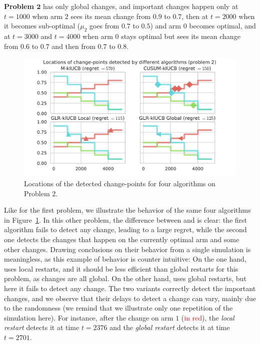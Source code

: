 \textbf{Problem $\bm{2}$} has only global changes, and important changes happen only at $t=1000$ when arm $2$ sees its mean change from $0.9$ to $0.7$, then at $t=2000$ when it becomes sub-optimal ($\mu_2$ goes from $0.7$ to $0.5$) and arm $0$ becomes optimal, and at $t=3000$ and $t=4000$ when arm $0$ stays optimal but sees its mean change from $0.6$ to $0.7$ and then from $0.7$ to $0.8$.

\begin{figure}[h!]  %
    \centering
    \includegraphics[width=0.96\linewidth]{2-Chapters/6-Chapter/Images/Visualizing_locations_of_change_points_for_different_algorithms__4algs_Pb2.pdf}
    \caption{Locations of the detected change-points for four algorithms on Problem 2.}
    \label{fig:6:Visualizing_locations_of_change_points_for_different_algorithms__4algs_Pb2}
\end{figure}

Like for the first problem, we illustrate the behavior of the same four algorithms in Figure~\ref{fig:6:Visualizing_locations_of_change_points_for_different_algorithms__4algs_Pb2}.
In this other problem, the difference between \MklUCB{} and \CUSUMklUCB{} is clear:
the first algorithm fails to detect any change, leading to a large regret,
while the second one detects the changes that happen on the currently optimal arm and some other changes.
Drawing conclusions on their behavior from a single simulation is meaningless, as this example of behavior is counter intuitive:
On the one hand, \CUSUM{} uses local restarts, and it should be less efficient than global restarts for this problem, as changes are all global.
On the other hand, \MklUCB{} uses global restarts, but here it fails to detect any change.
%
The two \GLRklUCB{} variants correctly detect the important changes, and we observe that their delays to detect a change can vary, mainly due to the randomness (we remind that we illustrate only one repetition of the simulation here).
For instance, after the change on arm $1$ (\textcolor{red}{in red}), the \emph{local restart} detects it at time $t=2376$ and the \emph{global restart} detects it at time $t=2701$.

